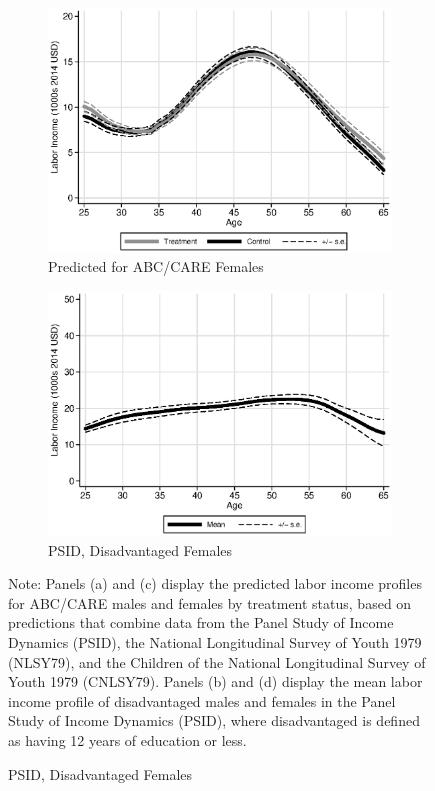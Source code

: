 \begin{figure}
\begin{subfigure}[h]{0.4\textwidth}
		\caption{Predicted for ABC/CARE Females} \label{fig:abcare0}
		\includegraphics[width=\textwidth]{output/labor_25-60_female_3.eps}
\end{subfigure}%
\begin{subfigure}[h]{0.4\textwidth}
	\centering
	\caption{PSID, Disadvantaged Females} \label{fig:psid0}
		\includegraphics[width=\textwidth]{output/psid_incomeprofiles_s0.eps}
\end{subfigure}
\footnotesize \justify
Note: Panels (a) and (c) display the predicted labor income profiles for ABC/CARE males and females by treatment status, based on predictions that combine data from the Panel Study of Income Dynamics (PSID), the National Longitudinal Survey of Youth 1979 (NLSY79), and the Children of the National Longitudinal Survey of Youth 1979 (CNLSY79). Panels (b) and (d) display the mean labor income profile of disadvantaged males and females in the Panel Study of Income Dynamics (PSID), where disadvantaged is defined as having 12 years of education or less.\\
\end{figure}

